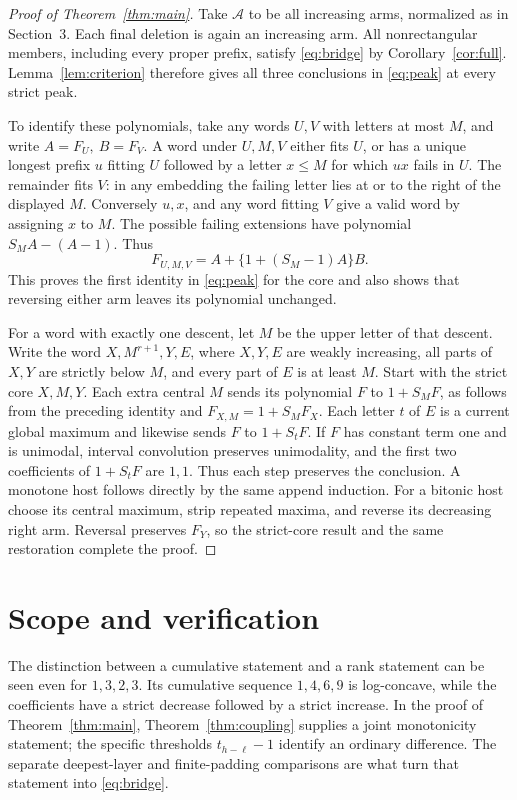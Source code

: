 \documentclass[11pt]{article}
\begin{document}
\begin{proof}[Proof of Theorem~\ref{thm:main}]
Take \(\mathcal A\) to be all increasing arms, normalized as in
Section~3. Each final deletion is again an increasing arm. All
nonrectangular members, including every proper prefix, satisfy
\eqref{eq:bridge} by Corollary~\ref{cor:full}. Lemma~\ref{lem:criterion}
therefore gives all three conclusions in \eqref{eq:peak} at every
strict peak.

To identify these polynomials, take any words \(U,V\) with letters at
most \(M\), and write \(A=F_U,\ B=F_V\). A word under \(U,M,V\) either
fits \(U\), or has a unique longest prefix \(u\) fitting \(U\) followed
by a letter \(x\le M\) for which \(ux\) fails in \(U\). The remainder
fits \(V\): in any embedding the failing letter lies at or to the right
of the displayed \(M\). Conversely \(u,x\), and any word fitting \(V\)
give a valid word by assigning \(x\) to \(M\). The possible failing
extensions have polynomial \(S_M A-(A-1)\). Thus
\[
            F_{U,M,V}=A+\{1+(S_M-1)A\}B.
\]
This proves the first identity in \eqref{eq:peak} for the core and
also shows that reversing either arm leaves its polynomial unchanged.

For a word with exactly one descent, let \(M\) be the upper letter of that
descent. Write the word \(X,M^{r+1},Y,E\), where \(X,Y,E\) are weakly
increasing, all parts of \(X,Y\) are strictly below \(M\), and every
part of \(E\) is at least \(M\). Start with the strict core \(X,M,Y\).
Each extra central \(M\) sends its polynomial \(F\) to \(1+S_MF\),
as follows from the preceding identity and \(F_{X,M}=1+S_MF_X\).
Each letter \(t\) of \(E\) is a current global maximum and likewise
sends \(F\) to \(1+S_tF\). If \(F\) has constant term one and is
unimodal, interval convolution preserves unimodality, and the first
two coefficients of \(1+S_tF\) are \(1,1\). Thus each step preserves
the conclusion. A monotone host follows directly by the same append
induction. For a bitonic host choose its central maximum, strip
repeated maxima, and reverse its decreasing right arm. Reversal
preserves \(F_Y\), so the strict-core result and the same restoration
complete the proof.
\end{proof}

\section{Scope and verification}
The distinction between a cumulative statement and a rank statement can
be seen even for \(1,3,2,3\). Its cumulative sequence \(1,4,6,9\) is
log-concave, while the coefficients have a strict decrease followed by a
strict increase. In the proof of Theorem~\ref{thm:main},
Theorem~\ref{thm:coupling} supplies a joint monotonicity statement;
the specific thresholds \(t_{h-\ell}-1\) identify an ordinary difference.
The separate deepest-layer and finite-padding comparisons are what turn
that statement into \eqref{eq:bridge}.
\end{document}
